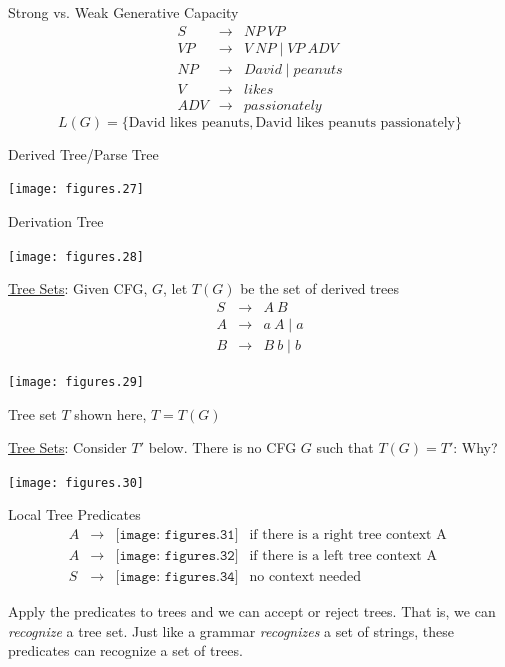 \documentclass[landscape]{slides}
\begin{document}
\begin{slide}{Strong vs. Weak Generative Capacity}
\begin{eqnarray}
S & \rightarrow & NP\ VP \\
VP & \rightarrow & V\ NP \mid VP\ ADV \\
NP & \rightarrow & David \mid peanuts \\
V & \rightarrow & likes \\
ADV & \rightarrow & passionately
\end{eqnarray}
\[ L(G) = \{ \textrm{David likes peanuts}, \textrm{David likes peanuts passionately} \} \]
\end{slide}

\begin{slide}{Derived Tree/Parse Tree}
\begin{center}
\texttt{[image: figures.27]}
\end{center}
\end{slide}

\begin{slide}{Derivation Tree}
\begin{center}
\texttt{[image: figures.28]}
\end{center}
\end{slide}

\begin{slide}{\underline{Tree Sets}: Given CFG, $G$, let $T(G)$ be the set of derived trees}
\begin{eqnarray}
S & \rightarrow & A\ B \nonumber \\
A & \rightarrow & a\ A \mid a \nonumber \\
B & \rightarrow & B\ b \mid b\nonumber 
\end{eqnarray}
\begin{center}
\texttt{[image: figures.29]}
\end{center}
Tree set $T$ shown here, $T=T(G)$
\end{slide}

\begin{slide}{\underline{Tree Sets}: Consider $T'$ below. There is no CFG $G$ such that $T(G)
  = T'$: {\color{red} Why?}}
\begin{center}
\texttt{[image: figures.30]}
\end{center}
\end{slide}

\begin{slide}{Local Tree Predicates}
\begin{eqnarray}
A & \rightarrow & \texttt{[image: figures.31]}\ \  \textrm{ if there is a
  right tree context A } \nonumber \\
A & \rightarrow & \texttt{[image: figures.32]}\ \  \textrm{ if there is a
  left tree context A } \nonumber \\
S & \rightarrow & \texttt{[image: figures.34]}\ \  \textrm{ no context needed } \nonumber 
\end{eqnarray}

Apply the predicates to trees and we can accept or reject trees. That is, we can {\em recognize} a tree set. Just like a grammar {\em recognizes} a set of strings, these predicates can recognize a set of trees.

\end{slide}
\end{document}

